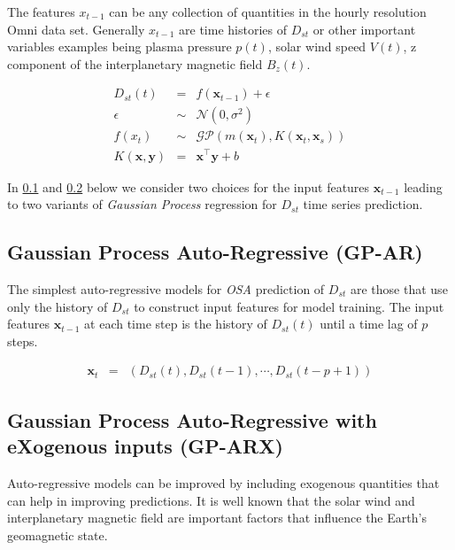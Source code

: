 \documentclass[referee,a4paper,12pt,traditabstract]{swsc}
\begin{document}
\begin{linenumbers}
The features $x_{t-1}$ can be any collection of quantities in the hourly resolution Omni data set. Generally $x_{t-1}$ are time histories of $D_{st}$ or other important variables examples being plasma pressure $p(t)$, solar wind speed $V(t)$, z component of the interplanetary magnetic field $B_z(t)$.

\begin{eqnarray}
    D_{st}(t) & = & f(\mathbf{x}_{t-1}) + \epsilon \label{eq:Dst} \\
    \epsilon & \sim & \mathcal{N}(0, \sigma^2) \label{eq:GPNoise} \\
    f(x_t) & \sim & \mathcal{GP}(m(\mathbf{x}_t), K(\mathbf{x}_t, \mathbf{x}_s)) \label{eq:DstGP} \\
    K(\mathbf{x}, \mathbf{y}) & = & \mathbf{x}^\intercal \mathbf{y} + b \label{eq:GPPoly}
\end{eqnarray}

In \ref{sec:gpar} and \ref{sec:gparx} below we consider two choices for the input features $\mathbf{x}_{t-1}$ leading to two variants of \emph{Gaussian Process} regression for $D_{st}$ time series prediction.

\subsection{Gaussian Process Auto-Regressive (GP-AR)} \label{sec:gpar}

The simplest auto-regressive models for \emph{OSA} prediction of $D_{st}$ are those that use only the history of $D_{st}$ to construct input features for model training. The input features $\mathbf{x}_{t-1}$ at each time step is the history of $D_{st}(t)$ until a time lag of $p$ steps.

\begin{eqnarray*}
    \mathbf{x}_t & = & \left(D_{st}(t), D_{st}(t-1), \cdots , D_{st}(t-p+1)\right)
\end{eqnarray*}

\subsection{Gaussian Process Auto-Regressive with eXogenous inputs (GP-ARX)} \label{sec:gparx}

Auto-regressive models can be improved by including exogenous quantities that can help in improving predictions. It is well known that the solar wind and interplanetary magnetic field are important factors that influence the Earth's geomagnetic state.


\end{linenumbers}
\end{document}

